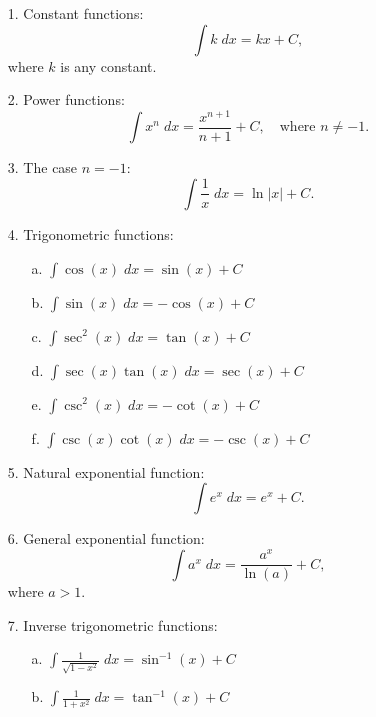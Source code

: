 \documentclass{ximera}
\begin{document}
\begin{enumerate}


\item[1.] Constant functions:
\[
\int k \; dx = kx + C,
\]
where $k$ is any constant.

\item[2.] Power functions:
\[
\int x^n \; dx = \frac{x^{n+1}}{n+1} + C, \quad \text{where $n\neq -1$.}
\]


\item[3.] The case $n = -1$:
\[
 \int \frac{1}{x} \; dx = \ln|x| + C.
\]

\item[4.] Trigonometric functions:

\begin{enumerate}

\item[a.] $\displaystyle{\int \cos(x) \; dx = \sin(x) + C}$
\item[b.] $\displaystyle{\int \sin(x) \; dx = -\cos(x) + C}$
\item[c.] $\displaystyle{\int \sec^2(x) \; dx = \tan(x) + C}$
\item[d.] $\displaystyle{\int \sec(x) \tan(x) \; dx = \sec(x) + C}$
\item[e.] $\displaystyle{\int \csc^2(x) \; dx = -\cot(x) + C}$
\item[f.] $\displaystyle{\int \csc(x) \cot(x) \; dx = -\csc(x) + C}$
 
\end{enumerate}


\item[5.] Natural exponential function:
\[
\int e^x \; dx = e^x + C.
\]

\item[6.] General exponential function:
\[
\int a^x \; dx = \frac{a^x}{\ln(a)} + C,
\]
where $a > 1$.

\item[7.] Inverse trigonometric functions:

\begin{enumerate}

\item[a.] $\displaystyle{\int \frac{1}{\sqrt{1-x^2}} \; dx = \sin^{-1}(x) + C}$
\item[b.] $\displaystyle{\int \frac{1}{1+x^2} \; dx = \tan^{-1}(x) + C}$

\end{enumerate}


\end{enumerate}
\end{document}
